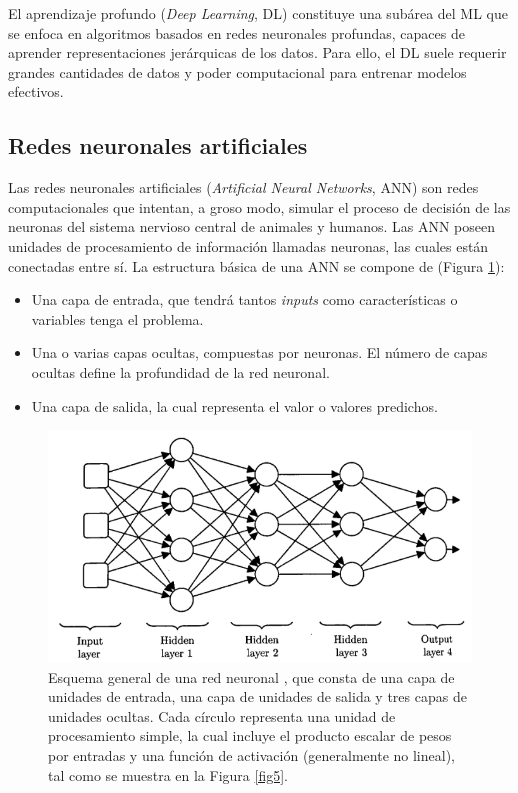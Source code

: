 El aprendizaje profundo (\textit{Deep Learning}, DL) \cite{26,78} constituye una subárea del ML que se enfoca en algoritmos basados en redes neuronales profundas, capaces de aprender representaciones jerárquicas de los datos. Para ello, el DL suele requerir grandes cantidades de datos y poder computacional para entrenar modelos efectivos.

\subsection{Redes neuronales artificiales}
Las redes neuronales artificiales (\textit{Artificial Neural Networks}, ANN) \cite{24, 25, 27} son redes computacionales que intentan, a groso modo, simular el proceso de decisión de las neuronas del sistema nervioso central de animales y humanos. Las ANN poseen unidades de procesamiento de información llamadas neuronas, las cuales están conectadas entre sí. La estructura básica de una ANN se compone de (Figura \ref{fig4}):
\begin{itemize}
	\item Una capa de entrada, que tendrá tantos \textit{inputs} como características o variables tenga el problema.
	\item Una o varias capas ocultas, compuestas por neuronas. El número de capas ocultas define la profundidad de la red neuronal.
	\item Una capa de salida, la cual representa el valor o valores predichos.
\end{itemize} 

\begin{figure}[h]
	\centering
	\includegraphics[scale=0.5]{imagenes/cap2/neural-network.png}
	\caption[Esquema de red neuronal.]{Esquema general de una red neuronal \cite{26}, que consta de una capa de unidades de entrada, una capa de unidades de salida y tres capas de unidades ocultas. Cada círculo representa una unidad de procesamiento simple, la cual incluye el producto escalar de pesos por entradas y una función de activación (generalmente no lineal), tal como se muestra en la Figura \ref{fig5}.}
	\label{fig4}
\end{figure}

